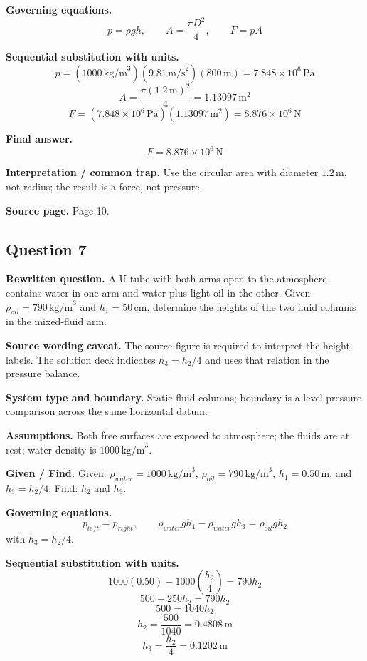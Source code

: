 \textbf{Governing equations.}
\[
p=\rho gh,\qquad A=\frac{\pi D^2}{4},\qquad F=pA
\]

\textbf{Sequential substitution with units.}
\[
p=(1000\,\text{kg/m}^3)(9.81\,\text{m/s}^2)(800\,\text{m})=7.848\times10^6\,\text{Pa}
\]
\[
A=\frac{\pi(1.2\,\text{m})^2}{4}=1.13097\,\text{m}^2
\]
\[
F=(7.848\times10^6\,\text{Pa})(1.13097\,\text{m}^2)=8.876\times10^6\,\text{N}
\]

\textbf{Final answer.}
\[
\boxed{F=8.876\times10^6\,\text{N}}
\]

\textbf{Interpretation / common trap.} Use the circular area with diameter $1.2\,\text{m}$, not radius; the result is a force, not pressure.

\textbf{Source page.} Page 10.

\subsection*{Question 7}
\textbf{Rewritten question.} A U-tube with both arms open to the atmosphere contains water in one arm and water plus light oil in the other. Given $\rho_{oil}=790\,\text{kg/m}^3$ and $h_1=50\,\text{cm}$, determine the heights of the two fluid columns in the mixed-fluid arm.

\textbf{Source wording caveat.} The source figure is required to interpret the height labels. The solution deck indicates $h_3=h_2/4$ and uses that relation in the pressure balance.

\textbf{System type and boundary.} Static fluid columns; boundary is a level pressure comparison across the same horizontal datum.

\textbf{Assumptions.} Both free surfaces are exposed to atmosphere; the fluids are at rest; water density is $1000\,\text{kg/m}^3$.

\textbf{Given / Find.}
Given: $\rho_{water}=1000\,\text{kg/m}^3$, $\rho_{oil}=790\,\text{kg/m}^3$, $h_1=0.50\,\text{m}$, and $h_3=h_2/4$.
Find: $h_2$ and $h_3$.

\textbf{Governing equations.}
\[
p_{left}=p_{right},\qquad \rho_{water}gh_1-\rho_{water}gh_3=\rho_{oil}gh_2
\]
with $h_3=h_2/4$.

\textbf{Sequential substitution with units.}
\[
1000(0.50)-1000\left(\frac{h_2}{4}\right)=790h_2
\]
\[
500-250h_2=790h_2
\]
\[
500=1040h_2
\]
\[
h_2=\frac{500}{1040}=0.4808\,\text{m}
\]
\[
h_3=\frac{h_2}{4}=0.1202\,\text{m}
\]

